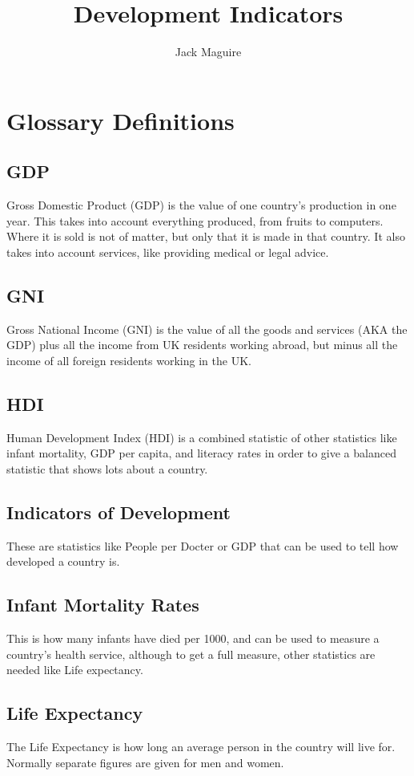 \documentclass[11pt, oneside]{article}   	%
\title{Development Indicators}
\author{Jack Maguire}
\begin{document}
\maketitle



\section{Glossary Definitions}
\subsection{GDP}
Gross Domestic Product (GDP) is the value of one country's production in one year. This takes into account everything produced, from fruits to computers. Where it is sold is not of matter, but only that it is made in that country. It also takes into account services, like providing medical or legal advice.

\subsection{GNI}
Gross National Income (GNI) is the value of all the goods and services (AKA the GDP) plus all the income from UK residents working abroad, but minus all the income of all foreign residents working in the UK.

\subsection{HDI}
Human Development Index (HDI) is a combined statistic of other statistics like infant mortality, GDP per capita, and literacy rates in order to give a balanced statistic that shows lots about a country.

\subsection{Indicators of Development}
These are statistics like People per Docter or GDP that can be used to tell how developed a country is.

\subsection{Infant Mortality Rates}
This is how many infants have died per 1000, and can be used to measure a country's health service, although to get a full measure, other statistics are needed like Life expectancy.

\subsection{Life Expectancy}
The Life Expectancy is how long an average person in the country will live for. Normally separate figures are given for men and women.
\end{document}

